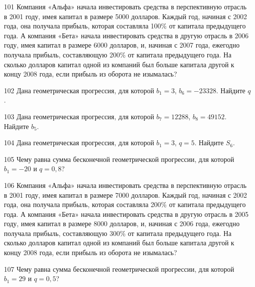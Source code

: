 \documentclass[4apaper]{article}
\begin{document}
\begin{taskBN}{101}
Компания «Альфа» начала инвестировать средства в перспективную отрасль в 2001 году, имея капитал в размере 5000 долларов. Каждый год, начиная с 2002 года, она получала прибыль, которая составляла 100\% от капитала предыдущего года. А компания «Бета» начала инвестировать средства в другую отрасль в 2006 году, имея капитал в размере 6000 долларов, и, начиная с 2007 года, ежегодно получала прибыль, составляющую 200\% от капитала предыдущего года. На сколько долларов капитал одной из компаний был больше капитала другой к концу 2008 года, если прибыль из оборота не изымалась?
\end{taskBN}

\begin{taskBN}{102}
Дана геометрическая прогрессия, для которой $b_1 = 3$, $b_{6}=-23328$. Найдите $q$.
\end{taskBN}

\begin{taskBN}{103}
Дана геометрическая прогрессия, для которой $b_{7} = 12288$, $b_{8}=49152$. Найдите $b_{5}$.
\end{taskBN}

\begin{taskBN}{104}
Дана геометрическая прогрессия, для которой $b_1 = 3$, $q=5$. Найдите $S_{6}$.
\end{taskBN}

\begin{taskBN}{105}
Чему равна сумма бесконечной геометрической прогрессии, для которой $b_1 = -20$ и $q=0,8$?
\end{taskBN}

\begin{taskBN}{106}
Компания «Альфа» начала инвестировать средства в перспективную отрасль в 2001 году, имея капитал в размере 7000 долларов. Каждый год, начиная с 2002 года, она получала прибыль, которая составляла 200\% от капитала предыдущего года. А компания «Бета» начала инвестировать средства в другую отрасль в 2005 году, имея капитал в размере 8000 долларов, и, начиная с 2006 года, ежегодно получала прибыль, составляющую 300\% от капитала предыдущего года. На сколько долларов капитал одной из компаний был больше капитала другой к концу 2008 года, если прибыль из оборота не изымалась?
\end{taskBN}

\begin{taskBN}{107}
Чему равна сумма бесконечной геометрической прогрессии, для которой $b_1 = 29$ и $q=0,5$?
\end{taskBN}
\end{document}
